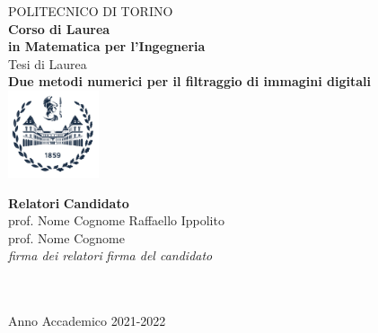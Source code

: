 \begin{titlepage}

\begin{center}

{\huge POLITECNICO DI TORINO}\\[1.5cm]
\textbf{Corso di Laurea\\in Matematica per l'Ingegneria}\\[3cm]

{\Large Tesi di Laurea}\\[1cm]
\textbf{\LARGE Due metodi numerici per il filtraggio di immagini digitali }\\[2cm]
\includegraphics[width=0.2\textwidth]{./Pictures/logo_polito_2021.jpg}
\vspace{4cm}


\begin{minipage}{0.85\textwidth}
\begin{flushleft}\large
\textbf{Relatori} \hfill \textbf{Candidato}\\
prof. Nome Cognome \hfill Raffaello Ippolito\\
prof. Nome Cognome \\
\textit{firma dei relatori} \hfill \textit{firma del candidato}\\[0.35cm]
\fillin\ \hfill \\
\fillin\ \hfill \fillin
\end{flushleft}
\end{minipage}

\vfill

Anno Accademico 2021-2022
\end{center}

\restoregeometry %

\end{titlepage}